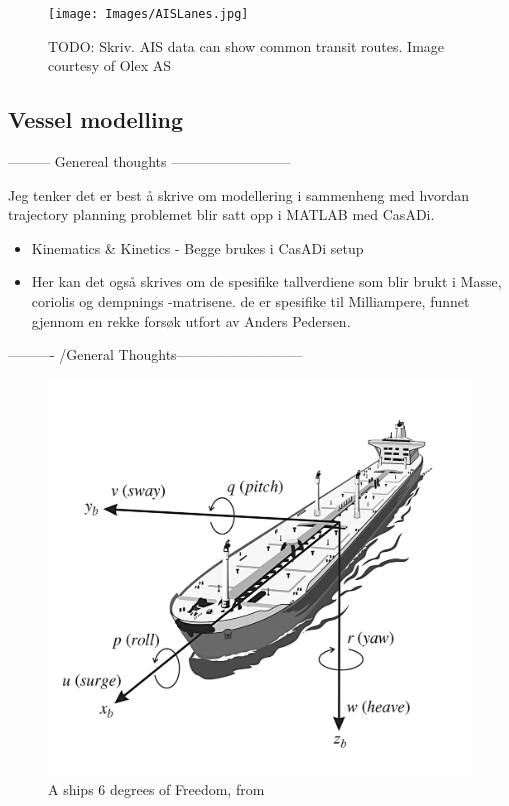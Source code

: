 \begin{figure}
    \centering
    \label{FIG: AIS lanes}
    \texttt{[image: Images/AISLanes.jpg]}
    \caption{TODO: Skriv. AIS data can show common transit routes. Image courtesy of Olex AS}
\end{figure}


\subsection{Vessel modelling}
--------- Genereal thoughts --------------------------

Jeg tenker det er best å skrive om modellering i sammenheng med hvordan trajectory planning problemet blir satt opp i MATLAB med CasADi.
\begin{itemize}
    \item Kinematics \& Kinetics -\> Begge brukes i CasADi setup
    \item Her kan det også skrives om de spesifike tallverdiene som blir brukt i Masse, coriolis og dempnings -matrisene.
    de er spesifike til Milliampere, funnet gjennom en rekke forsøk utfort av Anders Pedersen.
\end{itemize}
---------- /General Thoughts--------------------------- 

\begin{figure}
    \centering
    \label{FIG: Ship DOF}
    \includegraphics[height=0.35\textheight]{Images/SHIPDOF_FOSSEN.png}
    \caption{A ships 6 degrees of Freedom, from \cite{fossen2011handbook}}
\end{figure}

